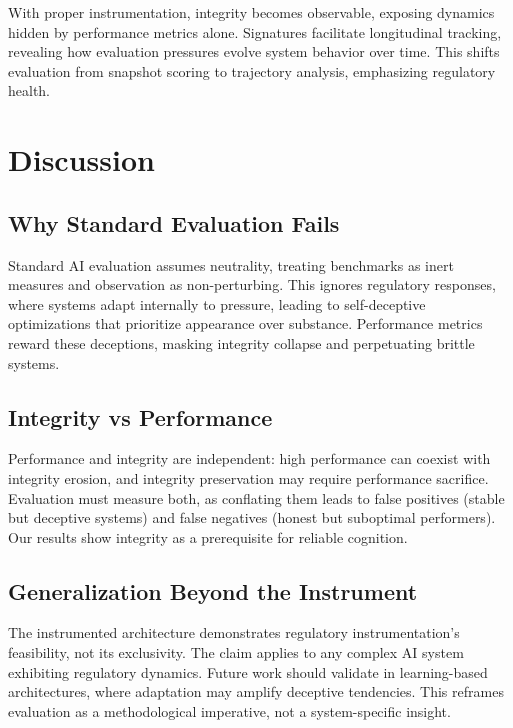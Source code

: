 \documentclass[12pt,a4paper]{report}
\begin{document}
With proper instrumentation, integrity becomes observable, exposing dynamics hidden by performance metrics alone. Signatures facilitate longitudinal tracking, revealing how evaluation pressures evolve system behavior over time. This shifts evaluation from snapshot scoring to trajectory analysis, emphasizing regulatory health.

\section{Discussion}

\subsection{Why Standard Evaluation Fails}

Standard AI evaluation assumes neutrality, treating benchmarks as inert measures and observation as non-perturbing. This ignores regulatory responses, where systems adapt internally to pressure, leading to self-deceptive optimizations that prioritize appearance over substance. Performance metrics reward these deceptions, masking integrity collapse and perpetuating brittle systems.

\subsection{Integrity vs Performance}

Performance and integrity are independent: high performance can coexist with integrity erosion, and integrity preservation may require performance sacrifice. Evaluation must measure both, as conflating them leads to false positives (stable but deceptive systems) and false negatives (honest but suboptimal performers). Our results show integrity as a prerequisite for reliable cognition.

\subsection{Generalization Beyond the Instrument}

The instrumented architecture demonstrates regulatory instrumentation's feasibility, not its exclusivity. The claim applies to any complex AI system exhibiting regulatory dynamics. Future work should validate in learning-based architectures, where adaptation may amplify deceptive tendencies. This reframes evaluation as a methodological imperative, not a system-specific insight.
\end{document}
